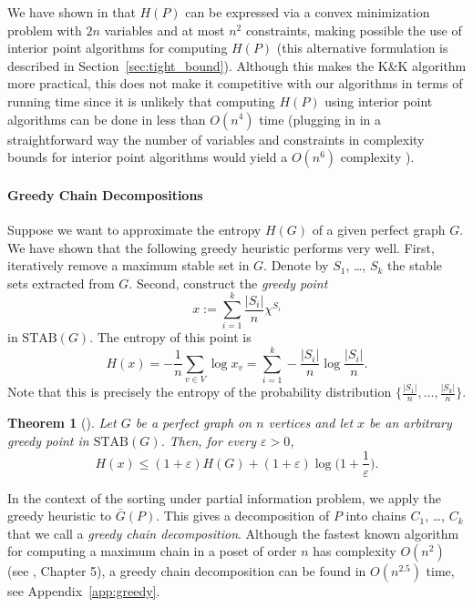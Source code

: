 \documentclass{article} \usepackage{fullpage}
\newtheorem{theorem}{Theorem}
\newcommand{\STAB}{\mathrm{STAB}}
\newcommand{\ent}{H}
\begin{document}
We have shown in \cite{POP_SICOMP} that $H(P)$ can be expressed via a convex minimization problem with $2n$ variables and at most $n^2$ constraints, making possible the use of interior point algorithms for computing $H(P)$ (this alternative formulation is described in Section~\ref{sec:tight_bound}).
Although this makes the K\&K algorithm more practical, this does not make it competitive with our algorithms in terms of running time since it is unlikely that computing $H(P)$ using interior point algorithms can be done in less than $O(n^4)$ time (plugging in in a straightforward way the number of variables and constraints in complexity bounds for interior point algorithms would yield a $O(n^6)$ complexity \cite{BV04}).

\paragraph*{Greedy Chain Decompositions}

Suppose we want to approximate the entropy $H(G)$ of a given perfect graph $G$. 
We have shown \cite{POP_SICOMP} that the following greedy heuristic performs very well. First, iteratively remove a maximum stable set in $G$. Denote by $S_1$, \ldots, $S_k$ the stable sets extracted from $G$. Second, construct the {\sl greedy point\/}
$$
x := \sum_{i=1}^k \frac{|S_i|}{n} \chi^{S_i}
$$ 
in $\STAB(G)$. The entropy of this point is
$$
\ent(x) = -\frac{1}{n} \sum_{v \in V} \log x_v
= \sum_{i = 1}^k -\frac{|S_i|}{n} \log \frac{|S_i|}{n}.
$$
Note that this is precisely the entropy of the probability distribution $\big\{\frac{|S_1|}{n},\ldots,\frac{|S_k|}{n}\big\}$.

\begin{theorem}[\cite{POP_SICOMP}]
\label{thm:greedy}
Let $G$ be a perfect graph on $n$ vertices and let $x$ be an arbitrary greedy point in $\STAB(G)$. 
Then, for every $\varepsilon > 0$,
$$
\ent(x) \leq (1+\varepsilon) H(G) + (1+\varepsilon) \log \Big(1 + \frac{1}{\varepsilon}\Big).
$$
\end{theorem}

In the context of the sorting under partial information problem, we apply the greedy heuristic to $\bar{G}(P)$. This gives a decomposition of $P$ into chains $C_1$, \ldots, $C_k$ that we call a {\sl greedy chain decomposition}. Although the fastest known algorithm for computing a maximum chain in a poset of order $n$ has complexity $O(n^2)$ (see \cite{Gbook}, Chapter 5), a greedy chain decomposition can be found in $O(n^{2.5})$ time, see Appendix~\ref{app:greedy}.
\end{document}
